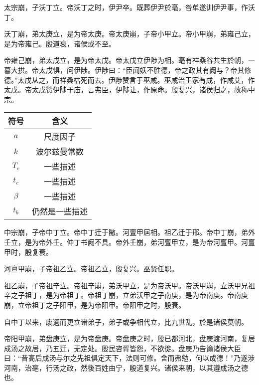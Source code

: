 \documentclass[UTF8,12pt,AutoFakeBold]{ctexart}
\begin{document}
	太宗崩，子沃丁立。帝沃丁之时，伊尹卒。既葬伊尹於亳，咎单遂训伊尹事，作沃丁。
	
	沃丁崩，弟太庚立，是为帝太庚。帝太庚崩，子帝小甲立。帝小甲崩，弟雍己立，是为帝雍己。殷道衰，诸侯或不至。
	
	帝雍己崩，弟太戊立，是为帝太戊。帝太戊立伊陟为相。亳有祥桑谷共生於朝，一暮大拱。帝太戊惧，问伊陟。伊陟曰：“臣闻妖不胜德，帝之政其有阙与？帝其修德。”太戊从之，而祥桑枯死而去。伊陟赞言于巫咸。巫咸治王家有成，作咸艾，作太戊。帝太戊赞伊陟于庙，言弗臣，伊陟让，作原命。殷复兴，诸侯归之，故称中宗。
	\begin{table}[htb]
		\centering
		\captionsetup{font=footnotesize}
		\label{表：符号对照表}
		\begin{tabular}{@{}cc@{}}
			\toprule
			符号          & 含义                                                              \\ \midrule
			$a$         & 尺度因子                                                            \\
			$k$         & 波尔兹曼常数                                                          \\
			$T_c$       & 一些描述                                                   \\
			$t_c$       & 一些描述                                                   \\
			$\beta$     & 一些描述                                           \\
			$t_b$       & 仍然是一些描述                                                        \\ \bottomrule
		\end{tabular}
	\end{table}
	中宗崩，子帝中丁立。帝中丁迁于隞。河亶甲居相。祖乙迁于邢。帝中丁崩，弟外壬立，是为帝外壬。仲丁书阙不具。帝外壬崩，弟河亶甲立，是为帝河亶甲。河亶甲时，殷复衰。
	
	河亶甲崩，子帝祖乙立。帝祖乙立，殷复兴。巫贤任职。
	
	祖乙崩，子帝祖辛立。帝祖辛崩，弟沃甲立，是为帝沃甲。帝沃甲崩，立沃甲兄祖辛之子祖丁，是为帝祖丁。帝祖丁崩，立弟沃甲之子南庚，是为帝南庚。帝南庚崩，立帝祖丁之子阳甲，是为帝阳甲。帝阳甲之时，殷衰。
	
	自中丁以来，废適而更立诸弟子，弟子或争相代立，比九世乱，於是诸侯莫朝。
	
	帝阳甲崩，弟盘庚立，是为帝盘庚。帝盘庚之时，殷已都河北，盘庚渡河南，复居成汤之故居，乃五迁，无定处。殷民咨胥皆怨，不欲徙。盘庚乃告谕诸侯大臣曰：“昔高后成汤与尔之先祖俱定天下，法则可修。舍而弗勉，何以成德！”乃遂涉河南，治亳，行汤之政，然後百姓由宁，殷道复兴。诸侯来朝，以其遵成汤之德也。
	
\end{document}
